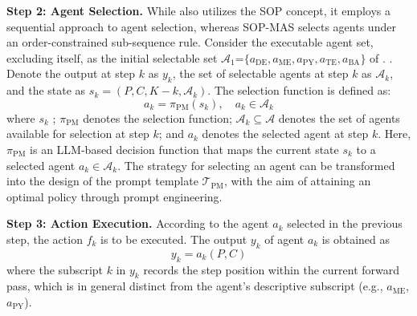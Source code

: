 \documentclass[preprint,12pt]{elsarticle}
\begin{document}
\medskip
\noindent\textbf{Step 2: Agent Selection.} While \citet{hongMetaGPTMetaProgramming2023a} also utilizes the SOP concept, it employs a sequential approach to agent selection, whereas SOP-MAS selects agents under an order-constrained sub-sequence rule. Consider the executable agent set, excluding  itself, as the initial selectable set $\mathcal{A}_1$=$\{a_{\text{DE}}, a_{\text{ME}}, a_{\text{PY}}, a_{\text{TE}}, a_{\text{BA}}\}$ of . . Denote the output at step $k$ as $y_k$, the set of selectable agents at step $k$ as $\mathcal{A}_k$, and the state as $s_k=(P, C, K-k, \mathcal{A}_k)$. The  selection function is defined as:
\begin{equation}
a_k=\pi_{\mathrm{PM}}\left(s_k\right), \quad a_k\in\mathcal{A}_k
\end{equation}
where $s_k$ ; $\pi_{\mathrm{PM}}$ denotes the  selection function; $\mathcal{A}_k \subseteq \mathcal{A}$ denotes the set of agents available for selection at step $k$; and $a_k$ denotes the selected agent at step $k$. Here, $\pi_{\mathrm{PM}}$ is an LLM-based decision function that maps the current state $s_k$ to a selected agent $a_k \in \mathcal{A}_k$. The strategy for selecting an agent can be transformed into the design of the prompt template $\mathcal{T}_\text{PM}$, with the aim of attaining an optimal policy through prompt engineering.

\medskip
\noindent\textbf{Step 3: Action Execution.}
According to the agent $a_k$ selected in the previous step, the action $f_k$ is to be executed. The output $y_k$ of agent $a_k$ is obtained as
\begin{equation}
y_k=a_k\left(P,C\right)
\end{equation}
where the subscript $k$ in $y_k$ records the step position within the current forward pass, which is in general distinct from the agent's descriptive subscript (e.g., $a_{\text{ME}}$, $a_{\text{PY}}$).
\end{document}
